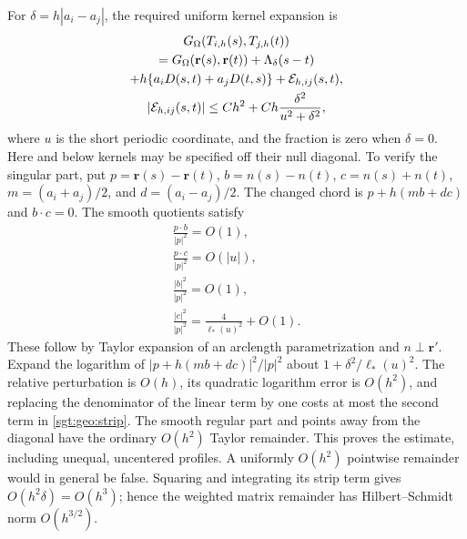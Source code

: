 \documentclass[aps,pra,reprint,superscriptaddress,longbibliography]{revtex4-2}
\begin{document}
For $\delta=h|a_i-a_j|$, the required uniform kernel expansion is
\begin{gather}
 G_\Omega(T_{i,h}(s),T_{j,h}(t))
\\
 =G_\Omega(\mathbf r(s),\mathbf r(t))+\Lambda_\delta(s-t)
\\
     +h\{a_iD(s,t)+a_jD(t,s)\}+\mathcal E_{h,ij}(s,t),\notag\\
 |\mathcal E_{h,ij}(s,t)|
 \leq Ch^2+Ch\frac{\delta^2}{u^2+\delta^2},
 \label{sgt:geo:strip}
\end{gather}
where $u$ is the short periodic coordinate, and the fraction is zero
when $\delta=0$.  Here and below kernels may be specified off their
null diagonal.  To verify the singular part, put
$p=\mathbf r(s)-\mathbf r(t)$,
$b=n(s)-n(t)$, $c=n(s)+n(t)$,
$m=(a_i+a_j)/2$, and $d=(a_i-a_j)/2$.
The changed chord is $p+h(mb+dc)$ and $b\cdot c=0$.
The smooth quotients satisfy
\[
\begin{gathered}
 \frac{p\cdot b}{|p|^2}=O(1),\\
 \frac{p\cdot c}{|p|^2}=O(|u|),\\
 \frac{|b|^2}{|p|^2}=O(1),\\
 \frac{|c|^2}{|p|^2}=\frac4{\ell_*(u)^2}+O(1).
\end{gathered}
\]
These follow by Taylor expansion of an arclength parametrization and
$n\perp\mathbf r'$.  Expand the logarithm of
$|p+h(mb+dc)|^2/|p|^2$ about $1+\delta^2/\ell_*(u)^2$.
The relative perturbation is $O(h)$, its quadratic logarithm error is
$O(h^2)$, and replacing the denominator of the linear term by one
costs at most the second term in \eqref{sgt:geo:strip}.
The smooth regular part and points away from the diagonal have the
ordinary $O(h^2)$ Taylor remainder.  This proves the estimate, including
unequal, uncentered profiles.  A uniformly $O(h^2)$ pointwise remainder
would in general be false.  Squaring and integrating its strip term
gives $O(h^2\delta)=O(h^3)$; hence the weighted matrix remainder has
Hilbert--Schmidt norm $O(h^{3/2})$.
\end{document}
